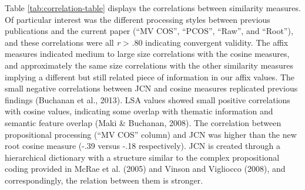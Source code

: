 \documentclass[english,,man]{apa6}
\begin{document}
Table \ref{tab:correlation-table} displays the correlations between similarity measures. Of particular interest was the different processing styles between previous publications and the current paper (\enquote{MV COS}, \enquote{PCOS}, \enquote{Raw}, and \enquote{Root}), and these correlations were all \emph{r} \textgreater{} .80 indicating convergent validity. The affix measures indicated medium to large size correlations with the cosine measures, and approximately the same size correlations with the other similarity measures implying a different but still related piece of information in our affix values. The small negative correlations between JCN and cosine measures replicated previous findings (Buchanan et al., 2013). LSA values showed small positive correlations with cosine values, indicating some overlap with thematic information and semantic feature overlap (Maki \& Buchanan, 2008). The correlation between propositional processing (\enquote{MV COS} column) and JCN was higher than the new root cosine measure (-.39 versus -.18 respectively). JCN is created through a hierarchical dictionary with a structure similar to the complex propositional coding provided in McRae et al. (2005) and Vinson and Vigliocco (2008), and correspondingly, the relation between them is stronger.
\end{document}
